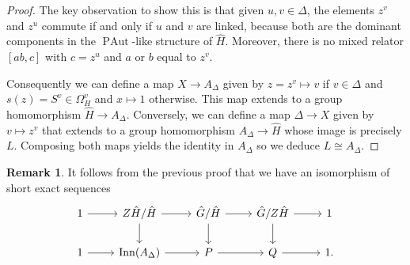 \documentclass[10pt]{amsart}
\theoremstyle{definition}
\newtheorem{remark}[theorem]{Remark}
\newcommand{\Inn}{{\rm Inn}}
\newcommand{\PAut}{\operatorname{PAut}}
\theoremstyle{definition}
\numberwithin{equation}{section}
\begin{document}
\begin{proof}
The key observation to show this is that given $u,v\in\Delta$, the elements $z^v$ and $z^u$ commute if and only if $u$ and $v$ are linked, because both are the dominant components in the $\PAut$-like structure of $\hat H$. Moreover, there is no mixed relator $[ab,c]$ with $c=z^u$ and $a$ or $b$ equal to $z^v$.

Consequently we can define a map  $X\to A_\Delta$ given by $z=z^v\mapsto v$ if $v\in\Delta$ and $s(z)=S^v\in\Omega_H^v$ and $x\mapsto 1$ otherwise.
This map extends to a group homomorphism $\hat H\to A_\Delta$. Conversely, we can define a map $\Delta\to X$ given by $v\mapsto z^v$ that extends to a group homomorphism $A_\Delta\to\hat H$ whose image is precisely $L$. Composing both maps yields the identity in $A_\Delta$ so we deduce $L\cong A_\Delta$.
\end{proof}

\begin{remark}\label{rem:Z} It follows from the previous proof that we have an isomorphism of short exact sequences
\[\begin{tikzcd}
1\arrow[r]&Z\hat H/\hat H\arrow[r] \arrow[d] &\hat G/\hat H\arrow[r] \arrow[d]  &\hat G/Z\hat H\arrow[r] \arrow[d]  &1\\
1\arrow[r]&\Inn(A_\Delta)\arrow[r]&P\arrow[r] &Q\arrow[r] & 1.
\end{tikzcd}\]
\end{remark}
\end{document}
